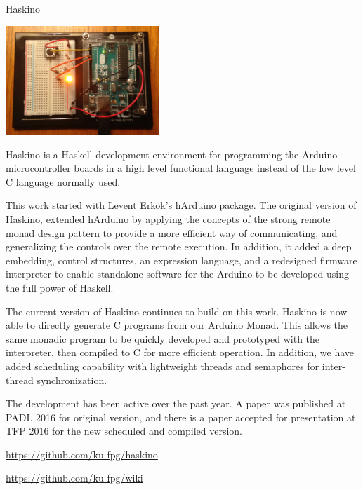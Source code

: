 \begin{hcarentry}{Haskino}
\label{Haskino}
\makeheader

\begin{center}
\includegraphics[width=0.435\textwidth]{html/Arduino.jpg}
\end{center}


Haskino is a Haskell development environment for programming the
Arduino microcontroller boards in a high level functional language
instead of the low level C language normally used.  

This work started with Levent Erk\"{o}k's hArduino package.  The original 
version of Haskino, extended hArduino by applying the concepts of the 
strong remote monad design pattern to provide a more efficient way 
of communicating, and generalizing the controls over the remote execution. 
In addition, it added a deep embedding, control structures, an expression
language, and a redesigned firmware interpreter to enable standalone 
software for the Arduino to be developed using the full power of Haskell.

The current version of Haskino continues to build on this work.
Haskino is now able to directly generate C programs from our Arduino
Monad.  This allows the same monadic program to be quickly developed
and prototyped with the interpreter, then compiled to C for more
efficient operation.  In addition, we have added scheduling capability
with lightweight threads and semaphores for inter-thread synchronization.

The development has been active over the past year.  A paper was 
published at PADL 2016 for original version, and there is a
paper accepted for presentation at TFP 2016 for the new
scheduled and compiled version.

\FurtherReading
\begin{compactitem}
\item
  \url{https://github.com/ku-fpg/haskino}
\item
  \url{https://github.com/ku-fpg/wiki}
\end{compactitem}
\end{hcarentry}
